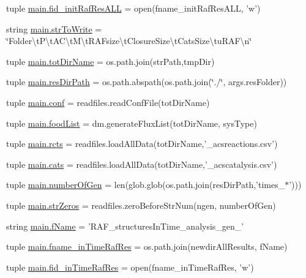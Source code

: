 \begin{DoxyCompactItemize}
\item 
tuple \hyperlink{a00111_a45aeb03f0d9cc30cb0a490354fd76d6c}{main.\-fid\-\_\-init\-Raf\-Res\-A\-L\-L} = open(fname\-\_\-init\-Raf\-Res\-A\-L\-L, 'w')
\item 
string \hyperlink{a00111_ab9980383a541b03ce91d6b812a4bf79a}{main.\-str\-To\-Write} = \char`\"{}Folder\textbackslash{}t\-P\textbackslash{}t\-A\-C\textbackslash{}t\-M\textbackslash{}t\-R\-A\-Fsize\textbackslash{}t\-Closure\-Size\textbackslash{}t\-Cats\-Size\textbackslash{}tu\-R\-A\-F\textbackslash{}n\char`\"{}
\item 
tuple \hyperlink{a00111_a82f73a786e4c93e909fd689ee0d0812e}{main.\-tot\-Dir\-Name} = os.\-path.\-join(str\-Path,tmp\-Dir)
\item 
tuple \hyperlink{a00111_a93d7d68ada532b3cedaab103283ab91a}{main.\-res\-Dir\-Path} = os.\-path.\-abspath(os.\-path.\-join(\char`\"{}./\char`\"{}, args.\-res\-Folder))
\item 
tuple \hyperlink{a00111_adc567db25548116293968a9102beab98}{main.\-conf} = readfiles.\-read\-Conf\-File(tot\-Dir\-Name)
\item 
tuple \hyperlink{a00111_a07ce1f0750b6dc5baff89792fc194152}{main.\-food\-List} = dm.\-generate\-Flux\-List(tot\-Dir\-Name, sys\-Type)
\item 
tuple \hyperlink{a00111_ac2fe1ed3228b8e616f25ccfbe4cc7dc4}{main.\-rcts} = readfiles.\-load\-All\-Data(tot\-Dir\-Name,'\-\_\-acsreactions.\-csv')
\item 
tuple \hyperlink{a00111_adc0282a6415a88834556e66807bcc800}{main.\-cats} = readfiles.\-load\-All\-Data(tot\-Dir\-Name,'\-\_\-acscatalysis.\-csv')
\item 
tuple \hyperlink{a00111_aabf82b9e9c2293000a67162becdd440d}{main.\-number\-Of\-Gen} = len(glob.\-glob(os.\-path.\-join(res\-Dir\-Path,'times\-\_\-$\ast$')))
\item 
tuple \hyperlink{a00111_a02d59015bebcf0ad1bc1162efca757c3}{main.\-str\-Zeros} = readfiles.\-zero\-Before\-Str\-Num(ngen, number\-Of\-Gen)
\item 
string \hyperlink{a00111_a9fff4b23f9489649601960dabc4a6cdd}{main.\-f\-Name} = 'R\-A\-F\-\_\-structures\-In\-Time\-\_\-analysis\-\_\-gen\-\_\-'
\item 
tuple \hyperlink{a00111_a64d742d069748ddd43a9378ef918d0b1}{main.\-fname\-\_\-in\-Time\-Raf\-Res} = os.\-path.\-join(newdir\-All\-Results, f\-Name)
\item 
tuple \hyperlink{a00111_ab82095abcedb97b7abf8e003f4724d0c}{main.\-fid\-\_\-in\-Time\-Raf\-Res} = open(fname\-\_\-in\-Time\-Raf\-Res, 'w')

\end{DoxyCompactItemize}
